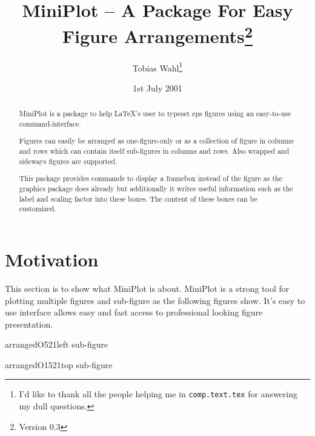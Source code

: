 \documentclass[12pt,a4paper]{article}
\newcommand{\comm}[1]{\texttt{#1}}
\begin{document}

\title{MiniPlot -- A Package For Easy Figure Arrangements\footnote{Version 0.3}}
\author{Tobias Wahl\footnote{I'd like to thank all the people helping me in \comm{comp.text.tex}
for answering my dull questions.}}
\date{1st July 2001}
\maketitle


\begin{abstract}
MiniPlot is a package to help \LaTeX's user to typeset eps figures
using an easy-to-use command-interface.

Figures can easily be arranged as one-figure-only or as a collection of
figure in columns and rows which can contain itself sub-figures in
columns and rows. Also wrapped and sideways figures are supported.

This package provides commands to display a framebox instead of
the figure as the graphics package does already but additionally
it writes useful information such as the label and scaling factor
into these boxes. The content of these boxes can be customized.
\end{abstract}

\tableofcontents


\section{Motivation}

This section is to show what MiniPlot is about. MiniPlot is a
strong tool for plotting multiple figures and sub-figure as the 
following figures show. It's easy to use interface allows easy and 
fast access to professional looking figure presentation.


\begin{arrangedFigure}{2}{2}{arrangedO521}{left sub-figure}
\setlength{\subFigureAboveCaptionSpace}{7mm} 
\end{arrangedFigure} 
\setlength{\subFigureAboveCaptionSpace}{0mm} 


\begin{arrangedFigure}{1}{4}{arrangedO1521}{top sub-figure}
\end{arrangedFigure}
\end{document}
